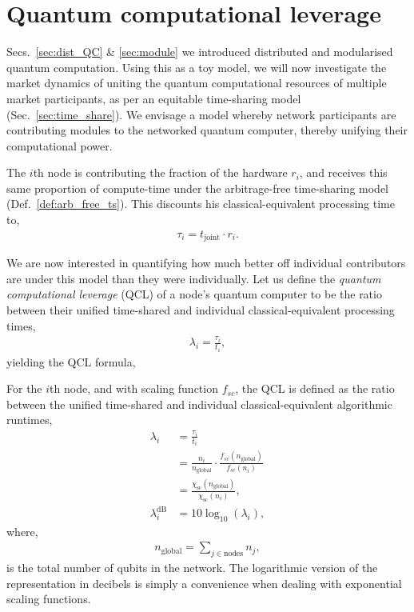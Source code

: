 %
%

\section{Quantum computational leverage}\label{sec:quant_ec_lev}

 Secs.~\ref{sec:dist_QC} \& \ref{sec:module} we introduced distributed and modularised quantum computation. Using this as a toy model, we will now investigate the market dynamics of uniting the quantum computational resources of multiple market participants, as per an equitable time-sharing model (Sec.~\ref{sec:time_share}). We envisage a model whereby network participants are contributing modules to the networked quantum computer, thereby unifying their computational power.

The $i$th node is contributing the fraction of the hardware $r_i$, and receives this same proportion of compute-time under the arbitrage-free time-sharing model (Def.~\ref{def:arb_free_ts}). This discounts his classical-equivalent processing time to,
\begin{align}
\tau_i = t_\mathrm{joint} \cdot r_i.
\end{align}

We are now interested in quantifying how much better off individual contributors are under this model than they were individually. Let us define the \textit{quantum computational leverage} (QCL) of a node's quantum computer to be the ratio between their unified time-shared and individual classical-equivalent processing times,
\begin{align}
\lambda_i = \frac{\tau_i}{t_i},
\end{align}
yielding the QCL formula,

\begin{definition} \label{def:quant_econ_lev}
For the $i$th node, and with scaling function $f_{sc}$, the QCL is defined as the ratio between the unified time-shared and individual classical-equivalent algorithmic runtimes,
\begin{align}
\lambda_i &= \frac{\tau_i}{t_i} \nonumber \\
&= \frac{n_i}{n_\mathrm{global}} \cdot \frac{f_{sc}(n_\mathrm{global})}{f_{sc}(n_i)} \nonumber \\
&= \frac{\chi_\mathrm{sc}(n_\mathrm{global})}{\chi_\mathrm{sc}(n_i)},\nonumber\\
\lambda_i^\mathrm{dB} &= 10\log_{10}(\lambda_i),
\end{align}
where,
\begin{align}
	n_\mathrm{global} = \sum_{j\in \mathrm{nodes}} n_j,
\end{align}
is the total number of qubits in the network. The logarithmic version of the representation in decibels is simply a convenience when dealing with exponential scaling functions.
\end{definition}

